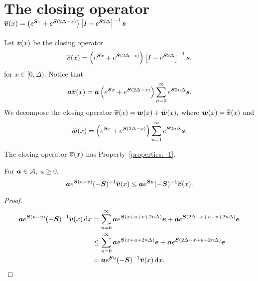 
\section{The closing operator \(\overline{\boldsymbol v} (x) = \left(e^{\boldsymbol{S} x} + e^{\boldsymbol{S} (2\Delta-x)}\right)\left[I-e^{\boldsymbol S  2\Delta}\right]^{-1}\boldsymbol s \)}

Let \(\overline{\boldsymbol v} (x)\) be the closing operator 
\[\overline{\boldsymbol v}(x) = \left(e^{\boldsymbol{S}x} + e^{\boldsymbol{S}(2\Delta-x)}\right)\left[I-e^{\boldsymbol S 2\Delta}\right]^{-1}\boldsymbol s,\]
for \(x\in[0,\Delta)\).
Notice that 
\[\boldsymbol a \overline{\boldsymbol v}(x) = \boldsymbol a \left(e^{\boldsymbol{S}x} + e^{\boldsymbol{S}(2\Delta-x)}\right)\sum_{n=0}^\infty e^{\boldsymbol S2n\Delta}\boldsymbol s.\]
We decompose the closing operator \(\displaystyle \overline{\boldsymbol v}(x)=\boldsymbol w(x)+\widetilde{\boldsymbol w}(x),\) where \(\boldsymbol w(x) = \widehat{\boldsymbol v}(x)\) and 
\[\widetilde{\boldsymbol w}(x) = \left(e^{\boldsymbol{S}x} + e^{\boldsymbol{S}(2\Delta-x)}\right)\sum_{n=1}^\infty e^{\boldsymbol S2n\Delta}\boldsymbol s.\]

\begin{lem}
	The closing operator \(\overline{\boldsymbol v}(x)\) has Property~\ref{properties: -1}.
	
	For \(\boldsymbol a \in\mathcal A\), \(u\geq 0\), 
	\[\boldsymbol a e^{\boldsymbol S(u+v)}(-\boldsymbol S)^{-1}\overline{\boldsymbol v}(x) \leq \boldsymbol a e^{\boldsymbol Su}(-\boldsymbol S)^{-1}\overline{\boldsymbol v}(x) . \]
\end{lem}
\begin{proof}
	\begin{align*}
		 \boldsymbol a e^{\boldsymbol S(u+v)}(-\boldsymbol S)^{-1}\overline{\boldsymbol v}(x)\, \mathrm{d} x &= \sum_{n=0}^\infty\boldsymbol a e^{\boldsymbol S(x+u+v+2n\Delta)}\boldsymbol e + \boldsymbol a  e^{\boldsymbol S(2\Delta-x + u + v + 2n\Delta)} \boldsymbol e
		\\ &\leq \sum_{n=0}^\infty \boldsymbol a e^{\boldsymbol S(x+u+2n\Delta)}\boldsymbol e + \boldsymbol a  e^{\boldsymbol S(2\Delta-x + u + 2n\Delta)} \boldsymbol e
		\\ &= \boldsymbol a e^{\boldsymbol Su}(-\boldsymbol S)^{-1}\overline{\boldsymbol v}(x)\, \mathrm{d} x.
	\end{align*}
\end{proof}

